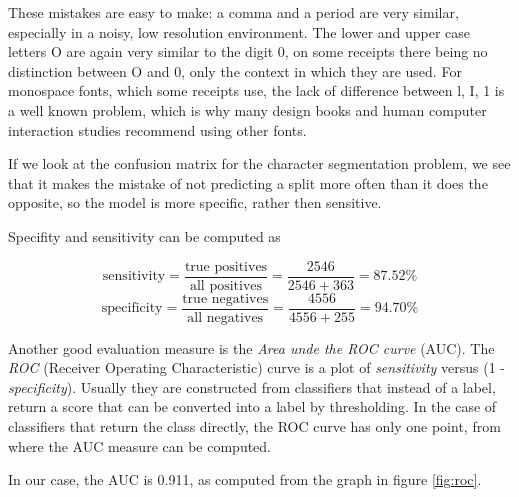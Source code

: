These mistakes are easy to make: a comma and a period are very similar, especially in a noisy, low resolution environment. The lower and upper case letters O are again very similar to the digit 0, on some receipts there being no distinction between O and 0, only the context in which they are used. For monospace fonts, which some receipts use, the lack of difference between l, I, 1 is a well known problem, which is why many design books and human computer interaction studies recommend using other fonts\cite{chaparro2006examining}. 

If we look at the confusion matrix for the character segmentation problem, we see that it makes the mistake of not predicting a split more often than it does the opposite, so the model is more specific, rather then sensitive. 

Specifity and sensitivity can be computed as\cite{Fawcett_2006}

\[
    \text{sensitivity} = \frac{\text{true positives}}{\text{all positives}} = \frac{2546}{2546+363} = 87.52 \%
\]
\[
    \text{specificity} = \frac{\text{true negatives}}{\text{all negatives}} = \frac{4556}{4556+255} =  94.70 \%
\]

Another good evaluation measure is the \textit{Area unde the ROC curve} (AUC)\cite{Fawcett_2006}. The \textit{ROC} (Receiver Operating Characteristic) curve is a plot of \textit{sensitivity} versus (1 - \textit{specificity}). Usually they are constructed from classifiers that instead of a label, return a score that can be converted into a label by thresholding. In the case of classifiers that return the class directly, the ROC curve has only one point, from where the AUC measure can be computed. 

In our case, the AUC is 0.911, as computed from the graph in figure \ref{fig:roc}. 
